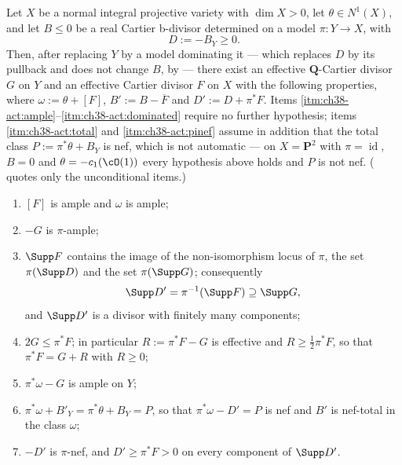 \begin{lemma}
\label{lem:ch38-activation}
Let $X$ be a normal integral projective variety with
$\dim X>0$, let $\theta\in N^1(X)$, and let $B\leq0$ be a real
Cartier b-divisor determined on a model $\pi:Y\to X$, with
\[
                              D:=-B_Y\ge0.
\tag{38.27}\label{eq:bj-realization-D}
\]
Then, after replacing $Y$ by a model dominating it --- which replaces
$D$ by its pullback and does not change $B$, by
 --- there exist an effective
$\mathbf Q$-Cartier divisor $G$ on $Y$ and an effective Cartier
divisor $F$ on $X$ with the following properties, where
$\omega:=\theta+[F]$, $B':=B-\overline F$ and $D':=D+\pi^*F$.  Items
\cref{itm:ch38-act:ample}--\cref{itm:ch38-act:dominated} require no further
hypothesis; items \cref{itm:ch38-act:total} and \cref{itm:ch38-act:pinef}
assume in addition that the total class $P:=\pi^*\theta+B_Y$ is nef, which
is not automatic --- on $X=\mathbf P^2$ with $\pi=\operatorname{id}$,
$B=0$ and $\theta=-c_1(\cO(1))$ every hypothesis above holds and $P$ is
not nef.  ( quotes only the unconditional items.)
\begin{enumerate}
\item\label{itm:ch38-act:ample} $[F]$ is ample and $\omega$ is ample;
\item\label{itm:ch38-act:relample} $-G$ is $\pi$-ample;
\item\label{itm:ch38-act:supports}
 $\Supp F$ contains the image of the non-isomorphism locus of $\pi$,
 the set $\pi(\Supp D)$ and the set $\pi(\Supp G)$; consequently
\[
 \Supp D'=\pi^{-1}(\Supp F)\supseteq\Supp G,
\]
 and $\Supp D'$ is a divisor with finitely many components;
\item\label{itm:ch38-act:dominated} $2G\leq\pi^*F$; in particular
 $R:=\pi^*F-G$ is effective and $R\geq\tfrac12\pi^*F$, so that
 $\pi^*F=G+R$ with $R\geq0$;
\item\label{itm:ch38-act:Qample} $\pi^*\omega-G$ is ample on $Y$;
\item\label{itm:ch38-act:total}
 $\pi^*\omega+B'_Y=\pi^*\theta+B_Y=P$, so that
 $\pi^*\omega-D'=P$ is nef and $B'$ is nef-total in the class
 $\omega$;
\item\label{itm:ch38-act:pinef} $-D'$ is $\pi$-nef, and
 $D'\geq\pi^*F>0$ on every component of $\Supp D'$.
\end{enumerate}
\end{lemma}

